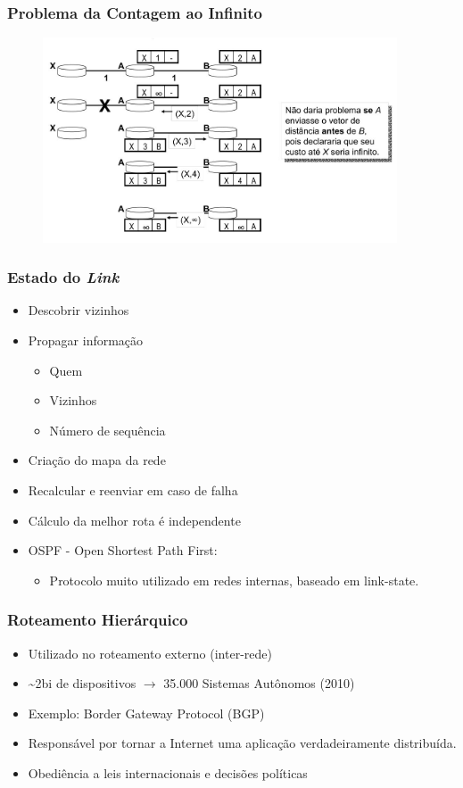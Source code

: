 \documentclass{beamer}
\begin{document}
\begin{frame}
\frametitle{Problema da Contagem ao Infinito}
\begin{figure}[htp]
\begin{center}
  \includegraphics[width=105mm]{Imagens/ContagemAoInfinito.jpeg}
  \label{contagem_ao_infinito}
\end{center}
\end{figure}
\end{frame}

\begin{frame}
\frametitle{Estado do \emph{Link}}

\begin{itemize}
  \item Descobrir vizinhos
  \item Propagar informação
  \begin{itemize}
     \item Quem
     \item Vizinhos
     \item Número de sequência
  \end{itemize}
  \item Criação do mapa da rede
  \item Recalcular e reenviar em caso de falha
  \item Cálculo da melhor rota é independente
  \item OSPF - Open Shortest Path First:
  \begin{itemize}
     \item Protocolo muito utilizado em redes internas,
        baseado em link-state.
  \end{itemize}
\end{itemize}
\end{frame}

\begin{frame}
\frametitle{Roteamento Hierárquico}
\begin{itemize}
  \setlength{\itemsep}{0.7cm}%
  \item Utilizado no roteamento externo (inter-rede)
  \item \textasciitilde2bi de dispositivos $\to$ 35.000 Sistemas Autônomos
  (2010)
  \item Exemplo: Border Gateway Protocol (BGP)
  \item Responsável por tornar a Internet uma aplicação verdadeiramente distribuída.
  \item Obediência a leis internacionais e decisões políticas
\end{itemize}
\end{frame}
\end{document}
